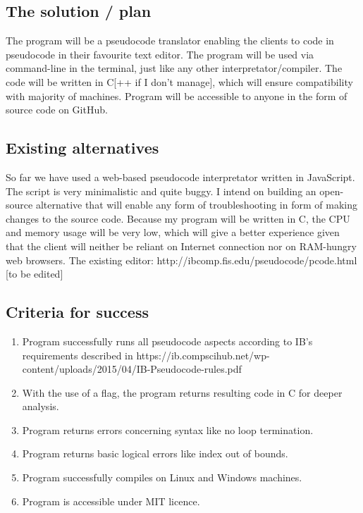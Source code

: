 \documentclass[10pt,a4paper,draft]{report}
\begin{document}
\subsection{The solution / plan}
The program will be a pseudocode translator enabling the clients to code in pseudocode in their favourite text editor. The program will be used via command-line in the terminal, 
just like any other interpretator/compiler. The code will be written in C[++ if I don't manage], which will ensure compatibility with majority of machines. Program will be 
accessible to anyone in the form of source code on GitHub.

\subsection{Existing alternatives}
So far we have used a web-based pseudocode interpretator written in JavaScript. The script is very minimalistic and quite buggy. I intend on building an open-source alternative
that will enable any form of troubleshooting in form of making changes to the source code. Because my program will be written in C, the CPU and memory usage will be very low, 
which will give a better experience given that the client will neither be reliant on Internet connection nor on RAM-hungry web browsers. The existing editor: 
http://ibcomp.fis.edu/pseudocode/pcode.html [to be edited]

\subsection{Criteria for success}
\begin{enumerate}
\item 
Program successfully runs all pseudocode aspects according to IB's requirements described in https://ib.compscihub.net/wp-content/uploads/2015/04/IB-Pseudocode-rules.pdf
\item
With the use of a flag, the program returns resulting code in C for deeper analysis.
\item 
Program returns errors concerning syntax like no loop termination.
\item
Program returns basic logical errors like index out of bounds.
\item
Program successfully compiles on Linux and Windows machines.
\item
Program is accessible under MIT licence.
\end{enumerate}
\end{document}
